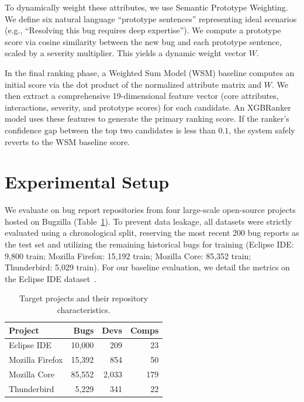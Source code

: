 \documentclass[sigconf,review,anonymous]{acmart}
\begin{document}
To dynamically weight these attributes, we use Semantic Prototype Weighting. We define six natural language ``prototype sentences'' representing ideal scenarios (e.g., ``Resolving this bug requires deep expertise''). We compute a prototype score via cosine similarity between the new bug and each prototype sentence, scaled by a severity multiplier. This yields a dynamic weight vector $W$.

In the final ranking phase, a Weighted Sum Model (WSM) baseline computes an initial score via the dot product of the normalized attribute matrix and $W$. We then extract a comprehensive 19-dimensional feature vector (core attributes, interactions, severity, and prototype scores) for each candidate. An XGBRanker model uses these features to generate the primary ranking score. If the ranker's confidence gap between the top two candidates is less than $0.1$, the system safely reverts to the WSM baseline score.

\section{Experimental Setup}

We evaluate on bug report repositories from four large-scale open-source projects hosted on Bugzilla (Table~\ref{tab:projects}). To prevent data leakage, all datasets were strictly evaluated using a chronological split, reserving the most recent 200 bug reports as the test set and utilizing the remaining historical bugs for training (Eclipse IDE: 9,800 train; Mozilla Firefox: 15,192 train; Mozilla Core: 85,352 train; Thunderbird: 5,029 train). For our baseline evaluation, we detail the metrics on the Eclipse IDE dataset~\cite{lamkanfi2013msr}.

\begin{table}[t]
\centering
\small
\caption{Target projects and their repository characteristics.}
\label{tab:projects}
\renewcommand{\arraystretch}{1.2}
\begin{tabular}{@{}lrrr@{}}
\toprule
\textbf{Project} & \textbf{Bugs} & \textbf{Devs} & \textbf{Comps} \\
\midrule
Eclipse IDE     & 10,000 & 209   & 23  \\
Mozilla Firefox & 15,392 & 854   & 50  \\
Mozilla Core    & 85,552 & 2,033 & 179 \\
Thunderbird     & 5,229  & 341   & 22  \\
\bottomrule
\end{tabular}
\end{table}
\end{document}
